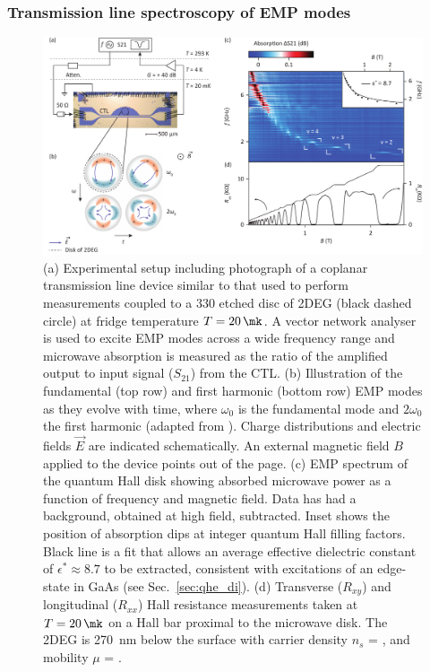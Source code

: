 \subsubsection{Transmission line spectroscopy of EMP modes}
\begin{figure}
\includegraphics[width=\textwidth]{fig1_QH}
\caption[Detecting microwave edge magnetoplasmons (EMPs)]{\label{FIG. 1.}
(a) Experimental setup including photograph of a coplanar transmission line device similar to that used to perform measurements coupled to a \SI{330}{\micron} etched disc of 2DEG (black dashed circle) at fridge temperature $T = \SI{20}{\mk}$. A vector network analyser is used to excite EMP modes across a wide frequency range and microwave absorption is measured as the ratio of the amplified output to input signal ($S_{21}$) from the CTL.
(b) Illustration of the fundamental (top row) and first harmonic (bottom row) EMP modes as they evolve with time, where $\omega_0$ is the fundamental mode and $2 \omega_0$ the first harmonic (adapted from \cite{1988ZhETF..94..217V}). Charge distributions and electric fields $\vec{E}$ are indicated schematically. An external magnetic field $B$ applied to the device points out of the page.
(c) EMP spectrum of the quantum Hall disk showing absorbed microwave power as a function of frequency and magnetic field. Data has had a background, obtained at high field, subtracted. Inset shows the position of absorption dips at integer quantum Hall filling factors. Black line is a fit that allows an average effective dielectric constant of $\epsilon^{*} \approx 8.7$ to be extracted, consistent with excitations of an edge-state in GaAs (see Sec.~\ref{sec:qhe_di}).
(d) Transverse ($R_{xy}$) and longitudinal ($R_{xx}$) Hall resistance measurements taken at $T = \SI{20}{\mk}$ on a Hall bar proximal to the microwave disk. The 2DEG is \SI{270}{\nano\meter} below the surface with carrier density $n_s$ = , and mobility $\mu$ = .}
\end{figure}

